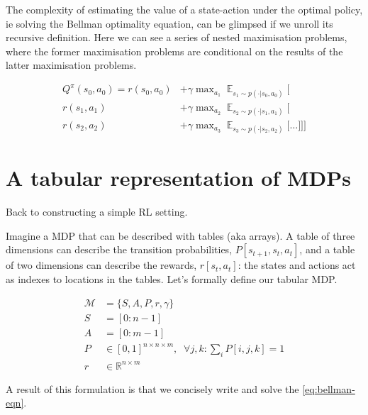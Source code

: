 The complexity of estimating the value of a state-action under the optimal policy, ie solving the Bellman optimality
equation, can be glimpsed if we unroll its recursive definition.
Here we can see a series of nested maximisation problems, where the former
maximisation problems are conditional on the results of the latter maximisation problems.

\begin{align*}
Q^{\pi}(s_0, a_0) = r(s_0, a_0) &+ \gamma \mathop{\text{max}}_{a_1} \mathop{\mathbb E}_{s_1\sim p(\cdot | s_0, a_0)} \Bigg[ \\
r(s_1, a_1)  &+ \gamma \mathop{\text{max}}_{a_2} \mathop{\mathbb E}_{s_2\sim p(\cdot | s_1, a_1)} \bigg[\\
r(s_2, a_2)  &+ \gamma \mathop{\text{max}}_{a_3} \mathop{\mathbb E}_{s_3\sim p(\cdot | s_2, a_2)} \Big[
\dots \Big] \bigg] \Bigg]
\end{align*}

\section{A tabular representation of MDPs}

Back to constructing a simple RL setting.

Imagine a MDP that can be described with tables (aka arrays). A table of
three dimensions can describe the transition probabilities, $P[s_{t+1}, s_t, a_t]$,
and a table of two dimensions can describe the rewards, $r[s_t, a_t]$: the
states and actions act as indexes to locations in the tables.
Let's formally define our tabular MDP.

\begin{align}
\mathcal M &= \{S, A, P, r, \gamma\}\; \tag{the MDP}\\
S &= [0:n-1] \tag{the state space}\\
A &= [0:m-1] \tag{the action space}\\
P &\in [0,1]^{n\times n \times m}, \;\;\forall j, k : \sum_i P[i, j, k] = 1 \tag{the transition fn}\\
r &\in \mathbb R^{n\times m} \tag{the reward fn}
\end{align}

A result of this formulation is that we concisely write and solve the \eqref{eq:bellman-eqn}. \footnotemark[0]


